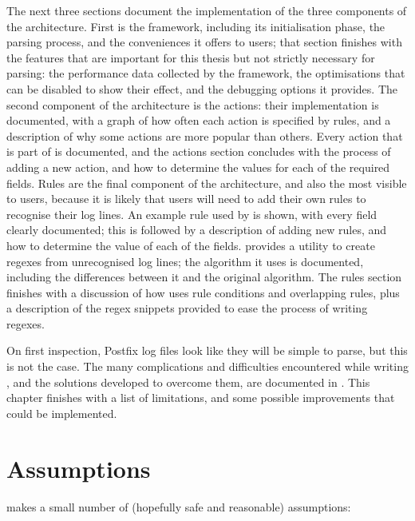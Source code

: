 The next three sections document the implementation of the three components
of the architecture.  First is the framework, including its initialisation
phase, the parsing process, and the conveniences it offers to users; that
section finishes with the features that are important for this thesis but
not strictly necessary for parsing: the performance data collected by the
framework, the optimisations that can be disabled to show their effect, and
the debugging options it provides.  The second component of the
architecture is the actions: their implementation is documented, with a
graph of how often each action is specified by rules, and a description of
why some actions are more popular than others.  Every action that is part
of \parsername{} is documented, and the actions section concludes with the
process of adding a new action, and how to determine the values for each of
the required fields.  Rules are the final component of the architecture,
and also the most visible to users, because it is likely that users will
need to add their own rules to recognise their log lines.  An example rule
used by \parsername{} is shown, with every field clearly documented; this
is followed by a description of adding new rules, and how to determine the
value of each of the fields.  \parsername{} provides a utility to create
regexes from unrecognised log lines; the algorithm it uses is documented,
including the differences between it and the original algorithm.  The rules
section finishes with a discussion of how \parsername{} uses rule
conditions and overlapping rules, plus a description of the regex snippets
provided to ease the process of writing regexes.

On first inspection, Postfix log files look like they will be simple to
parse, but this is not the case.  The many complications and difficulties
encountered while writing \parsername{}, and the solutions developed to
overcome them, are documented in .  This chapter
finishes with a list of \parsernames{} limitations, and some possible
improvements that could be implemented.

\section{Assumptions}

\parsername{} makes a small number of (hopefully safe and reasonable)
assumptions:

